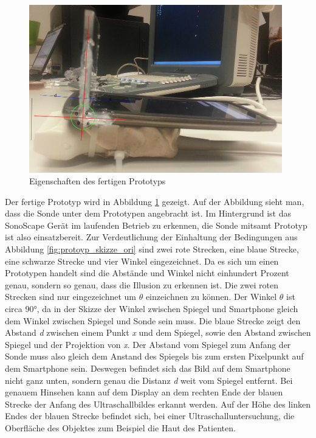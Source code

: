 \begin{figure}[h]
	\centering
	\includegraphics[width=0.98\textwidth]{Prototypen_Bau/Prototyp_fertig}
	\caption{Eigenschaften des fertigen Prototyps}
	\label{fig:protoyp}
\end{figure}
Der fertige Prototyp wird in Abbildung \ref{fig:protoyp} gezeigt. Auf der Abbildung sieht man, dass die Sonde unter dem Prototypen angebracht ist. Im Hintergrund ist das SonoScape Gerät im laufenden Betrieb zu erkennen, die Sonde mitsamt Prototyp ist also einsatzbereit. Zur Verdeutlichung der Einhaltung der Bedingungen aus Abbildung \ref{fig:protoyp_skizze_ori} sind zwei rote Strecken, eine blaue Strecke, eine schwarze Strecke und vier Winkel eingezeichnet. Da es sich um einen Prototypen handelt sind die Abstände und Winkel nicht einhundert Prozent genau, sondern so genau, dass die Illusion zu erkennen ist. Die zwei roten Strecken sind nur eingezeichnet um $\theta$ einzeichnen zu können. Der Winkel $\theta$ ist circa 90°, da in der Skizze der Winkel zwischen Spiegel und Smartphone gleich dem Winkel zwischen Spiegel und Sonde sein muss. Die blaue Strecke zeigt den Abstand \textit{d} zwischen einem Punkt \textit{x} und dem Spiegel, sowie den Abstand zwischen Spiegel und der Projektion von \textit{x}. Der Abstand vom Spiegel zum Anfang der Sonde muss also gleich dem Anstand des Spiegels bis zum ersten Pixelpunkt auf dem Smartphone sein. Deswegen befindet sich das Bild auf dem Smartphone nicht ganz unten, sondern genau die Distanz \textit{d} weit vom Spiegel entfernt. Bei genauem Hinsehen kann auf dem Display an dem rechten Ende der blauen Strecke der Anfang des Ultraschallbildes erkannt werden. Auf der Höhe des linken Endes der blauen Strecke befindet sich, bei einer Ultraschalluntersuchung, die Oberfläche des Objektes zum Beispiel die Haut des Patienten.\\
